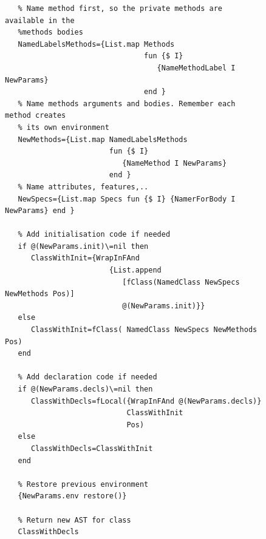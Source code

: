 \documentclass[a4paper]{memoir}
\begin{document}
\begin{appendices}
\begin{figure}[H]
\begin{lstlisting}
   % Name method first, so the private methods are available in the 
   %methods bodies
   NamedLabelsMethods={List.map Methods 
                                fun {$ I} 
                                   {NameMethodLabel I NewParams} 
                                end }
   % Name methods arguments and bodies. Remember each method creates
   % its own environment
   NewMethods={List.map NamedLabelsMethods 
                        fun {$ I} 
                           {NameMethod I NewParams} 
                        end }
   % Name attributes, features,..
   NewSpecs={List.map Specs fun {$ I} {NamerForBody I NewParams} end }

   % Add initialisation code if needed
   if @(NewParams.init)\=nil then
      ClassWithInit={WrapInFAnd 
                        {List.append 
                           [fClass(NamedClass NewSpecs NewMethods Pos)] 
                           @(NewParams.init)}}
   else
      ClassWithInit=fClass( NamedClass NewSpecs NewMethods Pos)
   end

   % Add declaration code if needed
   if @(NewParams.decls)\=nil then
      ClassWithDecls=fLocal({WrapInFAnd @(NewParams.decls)} 
                            ClassWithInit 
                            Pos)
   else
      ClassWithDecls=ClassWithInit
   end

   % Restore previous environment
   {NewParams.env restore()}

   % Return new AST for class
   ClassWithDecls
\end{lstlisting}
\end{figure}







\end{appendices}


\cleardoublepage
\pagestyle{empty}
\  
\cleardoublepage
\pagestyle{empty}
\  
\end{document}
